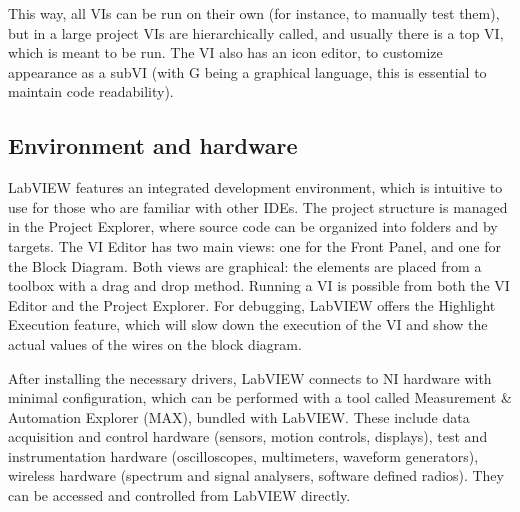 This way, all VIs can be run on their own (for instance, to manually test them), but in a large project VIs are hierarchically called, and usually there is a top VI, which is meant to be run. The VI also has an icon editor, to customize appearance as a subVI (with G being a graphical language, this is essential to maintain code readability). 
\subsection{Environment and hardware}
LabVIEW features an integrated development environment, which is intuitive to use for those who are familiar with other IDEs. The project structure is managed in the Project Explorer, where source code can be organized into folders and by targets. The VI Editor has two main views: one for the Front Panel, and one for the Block Diagram. Both views are graphical: the elements are placed from a toolbox with a drag and drop method. Running a VI is possible from both the VI Editor and the Project Explorer. For debugging, LabVIEW offers the Highlight Execution feature, which will slow down the execution of the VI and show the actual values of the wires on the block diagram.

After installing the necessary drivers, LabVIEW connects to NI hardware with minimal configuration, which can be performed with a tool called Measurement \& Automation Explorer (MAX), bundled with LabVIEW. These include data acquisition and control hardware (sensors, motion controls, displays), test and instrumentation hardware (oscilloscopes, multimeters, waveform generators), wireless hardware (spectrum and signal analysers, software defined radios). They can be accessed and controlled from LabVIEW directly.


